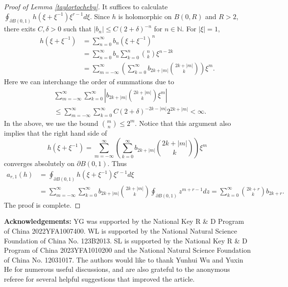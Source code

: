 \documentclass{article}
\begin{document}
\begin{proof}[Proof of Lemma \ref{taylortocheby}]
    It suffices to calculate
    $\oint_{\partial B(0,1)} h(\xi+\xi^{-1})\xi^{r-1}d\xi $. Since $h$ is holomorphic on $B(0,R)$ and $R>2$, there exits $C, \delta>0$ such that $|b_n|\leq C (2+\delta)^{-n}$ for $n\in \mathbb{N}$. For $|\xi|=1$,
    \begin{equation*}
    \begin{aligned}
        h(\xi+\xi^{-1})&=\sum_{n=0}^{\infty}b_n(\xi+{\xi}^{-1})^n\\
        &=\sum_{n=0}^{\infty}b_n\sum_{k=0}^n\binom{n}{k}\xi^{n-2k}\\
        &=\sum_{m=-\infty}^{\infty}\left(\sum_{k=0}^{\infty}b_{2k+|m|}\binom{2k+|m|}{k}\right)\xi^m.
    \end{aligned}
\end{equation*}
Here we can interchange the order of summations due to
$$
\begin{aligned}
&\sum_{m=-\infty}^{\infty}\sum_{k=0}^{\infty}\left|b_{2k+|m|}\binom{2k+|m|}{k}\xi^m\right|\\
&\leq \sum_{m=-\infty}^{\infty}\sum_{k=0}^{\infty} C (2+\delta)^{-2k-|m|}2^{2k+|m|}<\infty.
\end{aligned}
$$
In the above, we use the bound $\binom{m}{n}\leq 2^m$. Notice that this argument also implies that the right hand side of 
$$h(\xi+\xi^{-1})=\sum_{m=-\infty}^{\infty}\left(\sum_{k=0}^{\infty}b_{2k+|m|}\binom{2k+|m|}{k}\right)\xi^m$$
converges absolutely on $\partial B(0,1)$. Thus
$$
\begin{aligned}
    a_{r,1}(h)&=\oint_{\partial B(0,1)} h(\xi+\xi^{-1})\xi^{r-1}d\xi\\
    &=\sum_{m=-\infty}^{\infty}\sum_{k=0}^{\infty}b_{2k+|m|}\binom{2k+|m|}{k}\oint_{\partial B(0,1)} z^{m+r-1}dz=\sum_{k=0}^{\infty}\binom{2k+r}{k}b_{2k+r}.
\end{aligned}
$$
The proof is complete.
\end{proof}

\noindent \textbf{Acknowledgements:} YG was supported by the National Key R \& D Program of China 2022YFA1007400. WL is supported by the National Natural Science Foundation of China No. 123B2013. SL is supported by the National Key R \& D Program of China 2023YFA1010200 and the National Natural Science Foundation of China No. 12031017. The authors would like to thank Yunhui Wu and Yuxin He for numerous useful discussions, and are also grateful to the anonymous referee for several helpful suggestions that improved the article.




\end{document}
